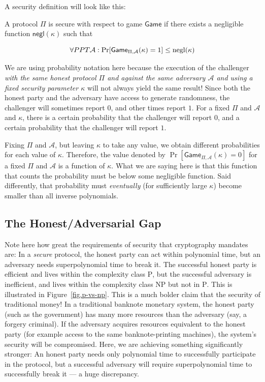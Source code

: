 A security definition will look like this:

\begin{definition}[Security]
  A protocol $\Pi$ is secure with respect to game $\textsf{Game}$ if there exists a negligible
  function $\textsf{negl}(\kappa)$ such that

  \[
    \forall PPT \mathcal{A}: \Pr[\textsf{Game}_{\Pi,\mathcal{A}}(\kappa) = 1] \leq \mathrm{negl}(\kappa)
  \]
\end{definition}

We are using probability notation here because the execution of the challenger \emph{with the
same honest protocol $\Pi$ and against the same adversary $\mathcal{A}$ and using a fixed security parameter
$\kappa$} will not always yield
the same result! Since both the honest party and the adversary have access to generate randomness,
the challenger will sometimes report $0$, and other times report $1$. For a fixed $\Pi$ and $\mathcal{A}$
and $\kappa$, there is a certain probability that the challenger will report $0$, and a certain
probability that the challenger will report $1$.

Fixing $\Pi$ and $\mathcal{A}$, but leaving $\kappa$
to take any value, we obtain different probabilities for each value of $\kappa$. Therefore,
the value denoted by $\Pr[\textsf{Game}_{\Pi,\mathcal{A}}(\kappa) = 0]$ for a fixed $\Pi$ and
$\mathcal{A}$ is a function of $\kappa$. What we are saying here is that this function that
counts the probability must be below some negligible function. Said differently, that probability
must \emph{eventually} (for sufficiently large $\kappa$) become smaller than all inverse polynomials.

\subsection*{The Honest/Adversarial Gap}

Note here how great the requirements of security that cryptography mandates are:
In a \emph{secure} protocol, the honest party can act within polynomial time,
but an adversary needs superpolynomial time to break it. The successful honest party
is efficient and lives within the
complexity class \textsc{P}, but the successful adversary is inefficient, and
lives within the complexity class \textsc{NP} but not in \textsc{P}. This is
illustrated in Figure~\ref{fig.p-vs-np}. This is a much bolder claim that the
security of traditional money! In a traditional banknote monetary system, the honest party
(such as the government) has many more resources than the adversary (say, a forgery
criminal). If the adversary acquires resources equivalent to the honest party (for example
access to the same banknote-printing machines), the system's security will be
compromised. Here, we are achieving something significantly stronger: An honest
party needs only polynomial time to successfully participate in the protocol,
but a successful adversary will require superpolynomial time to successfully break it
--- a huge discrepancy.

